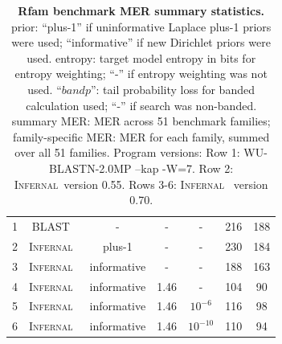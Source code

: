 \documentclass[11pt]{article}
\def\infernal{\textsc{Infernal}~}
\def\blast{\textsc{BLAST}~}
\begin{document}
\begin{table}[htb]
\begin{center}
\begin{tabular}{ccccccc}
1 & \blast & - & - & - & 216 & 188 \\
2 & \infernal & plus-1 & - & - & 230 & 184 \\
3 & \infernal & informative & - & - & 188 & 163 \\
4 & \infernal & informative & 1.46 & - & 104 & 90 \\
5 & \infernal & informative & 1.46 & $10^{-6}$ & 116 & 98 \\
6 & \infernal & informative & 1.46 & $10^{-10}$ & 110 & 94 \\ 
\end{tabular}
\end{center}
\caption{\textbf{Rfam benchmark MER summary statistics.} 
    prior: ``plus-1'' if uninformative Laplace plus-1 priors were
    used; ``informative'' if new Dirichlet priors were used.
    entropy: target model entropy in bits for entropy weighting; ``-''
    if entropy weighting was not used.
    ``$bandp$'': tail probability loss for banded calculation used; ``-'' if search
    was non-banded. summary MER: MER across 51 benchmark
    families; family-specific MER: MER for each family, summed
    over all 51 families. Program versions: Row 1: WU-BLASTN-2.0MP
    --kap -W=7. Row 2: \infernal version 0.55. Rows 3-6: \infernal
    version 0.70.}
\label{tbl:rmarkmerlist}
\end{table}
\fi
\end{document}
